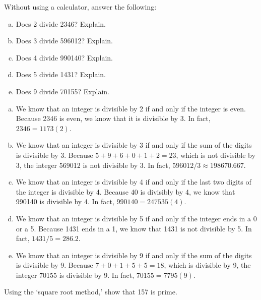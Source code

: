 \documentclass[11pt,letterpaper]{article}
\begin{document}
\newpage



 Without using a calculator, answer the following:
	\begin{enumerate}[(a)]
	\item Does 2 divide 2346? Explain.
	\item Does 3 divide 596012? Explain.
	\item Does 4 divide 990140? Explain.
	\item Does 5 divide 1431? Explain.
	\item Does 9 divide 70155? Explain. 
	\end{enumerate} \pspace

\sol
\begin{enumerate}[(a)]
\item We know that an integer is divisible by 2 if and only if the integer is even. Because 2346 is even, we know that it is divisible by 3. In fact, $2346= 1173(2)$. 

\item We know that an integer is divisible by 3 if and only if the sum of the digits is divisible by 3. Because $5 + 9 + 6 + 0 + 1 + 2= 23$, which is not divisible by 3, the integer 569012 is not divisible by 3. In fact, $596012/3 \approx 198670.667$. 
 
\item We know that an integer is divisible by 4 if and only if the last two digits of the integer is divisible by 4. Because 40  is divisibly by 4, we know that 990140 is divisible by 4. In fact, $990140= 247535(4)$. 

\item We know that an integer is divisible by 5 if and only if the integer ends in a 0 or a 5. Because 1431 ends in a 1, we know that 1431 is not divisible by 5. In fact, $1431/5= 286.2$.

\item We know that an integer is divisible by 9 if and only if the sum of the digits is divisible by 9. Because $7 + 0 + 1 + 5 + 5= 18$, which is divisible by 9, the integer 70155 is divisible by 9. In fact, $70155= 7795(9)$. 
\end{enumerate}



\newpage



 Using the `square root method,' show that 157 is prime. \pspace
\end{document}
